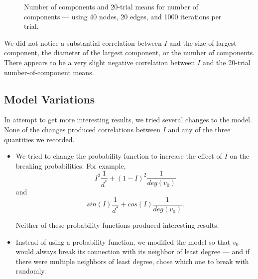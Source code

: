 \documentclass[a4paper,10pt]{article}
\begin{document}
\begin{figure}[H]
\begin{center}
\caption{Number of components and 20-trial means for number of components --- using 40 nodes, 20 edges, and 1000 iterations per trial.}
\end{center}
\end{figure} 

We did not notice a substantial correlation between $I$ and the size of largest component, the diameter of the largest component, or the number of components. There appears to be a very slight negative correlation between $I$ and the 20-trial number-of-component means.


\subsection{Model Variations}
In attempt to get more interesting results, we tried several changes to the model. None of the changes produced correlations between $I$ and any of the three quantities we recorded.

\begin{itemize}

 \item We tried to change the probability function to increase the effect of $I$ on the breaking probabilities. For example,
 \begin{equation}
  I^2 \frac{1}{d^*} + (1 - I)^2\frac{1}{deg(v_0)}
 \end{equation}
and
 \begin{equation}
  sin(I) \frac{1}{d^*} + cos(I)\frac{1}{deg(v_0)}.
 \end{equation}

 Neither of these probability functions produced interesting results.

 \item Instead of using a probability function, we modified the model so that $v_0$ would always break its connection with its neighbor of least degree --- and if there were multiple neighbors of least degree, chose which one to break with randomly. 

\end{itemize}
\end{document}
